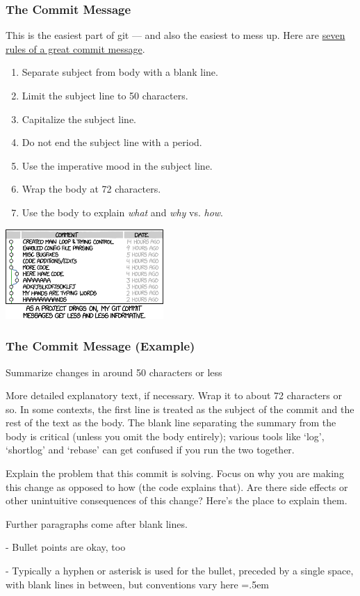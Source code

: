 \documentclass{beamer}
\newenvironment{lcverbatim}
 {\SaveVerbatim{cverb}}
 {\endSaveVerbatim
  \flushleft\fboxrule=0pt\fboxsep=.5em
  \scriptsize
  \colorbox{cverbbg}{%
    \makebox[\dimexpr\linewidth-2\fboxsep][l]{\BUseVerbatim{cverb}}%
  }
  \endflushleft
}
\begin{document}
\begin{frame}
    \frametitle{The Commit Message}
    This is the easiest part of git --- and also the easiest to mess up. Here are \href{http://chris.beams.io/posts/git-commit/}{seven rules of a great commit message}.
    \begin{multicols}{2}
        \begin{enumerate}
            \item Separate subject from body with a blank line.
            \item Limit the subject line to 50 characters.
            \item Capitalize the subject line.
            \item Do not end the subject line with a period.
            \item Use the imperative mood in the subject line.
            \item Wrap the body at 72 characters.
            \item Use the body to explain \textit{what} and \textit{why} vs. \textit{how}.
        \end{enumerate}

        \begin{center}
            \includegraphics[width=0.45\textwidth]{xkcd-2}
        \end{center}
    \end{multicols}
\end{frame}

\begin{frame}[fragile]
    \frametitle{The Commit Message (Example)}

    \begin{lcverbatim}
Summarize changes in around 50 characters or less

More detailed explanatory text, if necessary. Wrap it to about 72
characters or so. In some contexts, the first line is treated as the
subject of the commit and the rest of the text as the body. The
blank line separating the summary from the body is critical (unless
you omit the body entirely); various tools like `log', `shortlog'
and `rebase' can get confused if you run the two together.

Explain the problem that this commit is solving. Focus on why you
are making this change as opposed to how (the code explains that).
Are there side effects or other unintuitive consequences of this
change? Here's the place to explain them.

Further paragraphs come after blank lines.

 - Bullet points are okay, too

 - Typically a hyphen or asterisk is used for the bullet, preceded
   by a single space, with blank lines in between, but conventions
   vary here
    \end{lcverbatim}
\end{frame}
\end{document}
